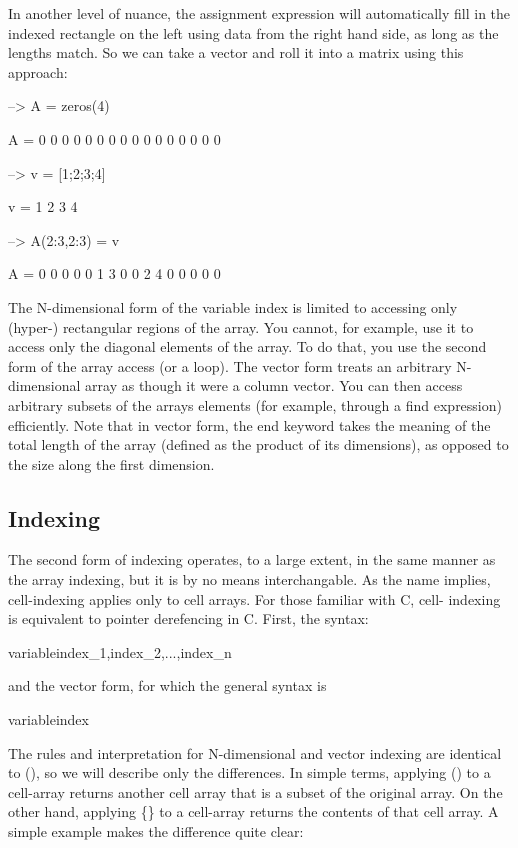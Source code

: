In another level of nuance, the assignment expression will automatically fill in the indexed rectangle on the left using data from the right hand side, as long as the lengths match. So we can take a vector and roll it into a matrix using this approach\-:


\begin{DoxyVerbInclude}
--> A = zeros(4)

A = 
 0 0 0 0 
 0 0 0 0 
 0 0 0 0 
 0 0 0 0 

--> v = [1;2;3;4]

v = 
 1 
 2 
 3 
 4 

--> A(2:3,2:3) = v

A = 
 0 0 0 0 
 0 1 3 0 
 0 2 4 0 
 0 0 0 0 
\end{DoxyVerbInclude}


The N-\/dimensional form of the variable index is limited to accessing only (hyper-\/) rectangular regions of the array. You cannot, for example, use it to access only the diagonal elements of the array. To do that, you use the second form of the array access (or a loop). The vector form treats an arbitrary N-\/dimensional array as though it were a column vector. You can then access arbitrary subsets of the arrays elements (for example, through a {\ttfamily find} expression) efficiently. Note that in vector form, the {\ttfamily end} keyword takes the meaning of the total length of the array (defined as the product of its dimensions), as opposed to the size along the first dimension. \hypertarget{variables_indexing_Cell}{}\subsection{Indexing}\label{variables_indexing_Cell}
The second form of indexing operates, to a large extent, in the same manner as the array indexing, but it is by no means interchangable. As the name implies, {\ttfamily cell}-\/indexing applies only to {\ttfamily cell} arrays. For those familiar with {\ttfamily C}, cell-\/ indexing is equivalent to pointer derefencing in {\ttfamily C}. First, the syntax\-: \begin{DoxyVerb}  variable{index_1,index_2,...,index_n}
\end{DoxyVerb}
 and the vector form, for which the general syntax is \begin{DoxyVerb}  variable{index}
\end{DoxyVerb}
 The rules and interpretation for N-\/dimensional and vector indexing are identical to {\ttfamily ()}, so we will describe only the differences. In simple terms, applying {\ttfamily ()} to a cell-\/array returns another cell array that is a subset of the original array. On the other hand, applying {\ttfamily \{\}} to a cell-\/array returns the contents of that cell array. A simple example makes the difference quite clear\-:


